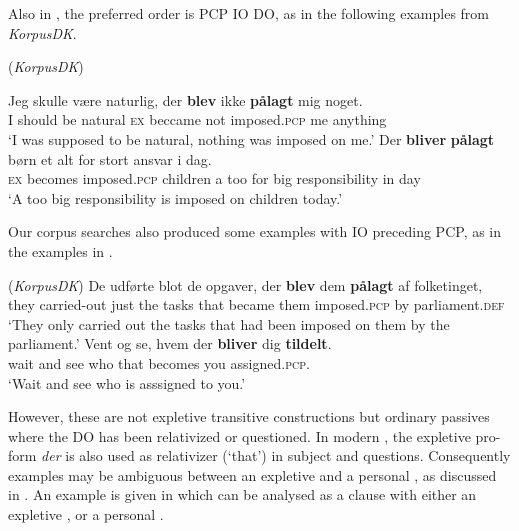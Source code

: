 \documentclass[output=paper]{LSP/langsci}
\begin{document}
 \noindent Also in , the preferred order is PCP IO DO, as in the following examples from \textit{KorpusDK}.

\ea%
    \label{ex:engdahl:26}
     (\textit{KorpusDK})
    \ea \label{ex:engdahl:26a}
    
\gll    Jeg skulle være naturlig,   der   \textbf{blev}  ikke \textbf{pålagt}    mig   noget.\\
I should be  natural  \textsc{ex} beccame not imposed.\textsc{pcp} me anything
\\
\glt ‘I was supposed to be natural, nothing was imposed on me.'
\ex
\gll     Der   \textbf{bliver}     \textbf{pålagt}    børn  et   alt   for   stort     ansvar    i dag.\\
  \textsc{ex}   becomes  imposed.\textsc{pcp}  children  a    too for big responsibility  in day\\
  \glt ‘A too big responsibility is imposed on children today.'
\z
\z

\noindent Our corpus searches also produced some examples with IO preceding PCP, as in the examples in .

\ea%
\label{ex:engdahl:27}
 (\textit{KorpusDK})
\ea
\gll De     udførte  blot   de   opgaver, der   \textbf{blev}  dem \textbf{pålagt}      af   folketinget,\\
  they  carried-out  just  the    tasks that  became  them  imposed.\textsc{pcp}  by  parliament\textsc{.def}\\
  \glt ‘They only carried out the tasks that  had been imposed on them by the parliament.'
\ex
\gll   Vent og     se,   hvem   {der} {\textbf{bliver}} {dig} {\textbf{tildelt}}.\\
  wait  and  see  who     that  becomes    you  assigned.\textsc{pcp}.\\
  \glt ‘Wait and see who is asssigned to you.'
\z
\z

\noindent However, these are not expletive transitive constructions but ordinary passives where the DO has been relativized or questioned. In modern , the expletive pro-form \textit{der} is also used as relativizer (‘that’) in subject  and questions. Consequently examples may be ambiguous between an expletive and a personal , as discussed in  \cite{EngdahlLaanemets2015prepositional}. An example is given in  which can be analysed as a  clause with either an expletive  , or a personal  .
\end{document}
